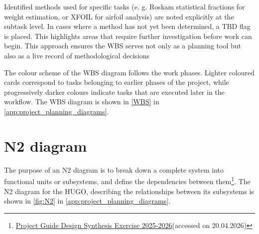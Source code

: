 Identified methods used for specific tasks (e. g. Roskam statistical fractions for weight estimation, or XFOIL for airfoil analysis) are noted explicitly at the subtask level.
In cases where a method has not yet been determined, a TBD flag is placed. This highlights areas that require further investigation before work can begin. This approach ensures the WBS serves not only as a planning tool but also as a live record of methodological decisions

The colour scheme of the WBS diagram follows the work phases. Lighter coloured cards correspond to tasks belonging to earlier phases of the project, while progressively darker colours indicate tasks that are executed later in the workflow. The WBS diagram is shown in \autoref{WBS} in \autoref{app:project_planning_diagrams}.

\section{N2 diagram}
\label{sec:n2_diagram}
The purpose of an N2 diagram is to break down a complete system into functional units or subsystems, and define the dependencies between them\footnote{\href{https://github.com/Teo-Cokonaj/DSE-28/blob/main/docs/Projects/Project_Guide_2025-2026_Spring_Saullo_Castro.pdf}{Project Guide Design Synthesis Exercise 2025-2026}(accessed on 20.04.2026)}. The N2 diagram for the HUGO, describing the relationships between its subsystems is shown in \autoref{fig:N2} in \autoref{app:project_planning_diagrams}.

% 



